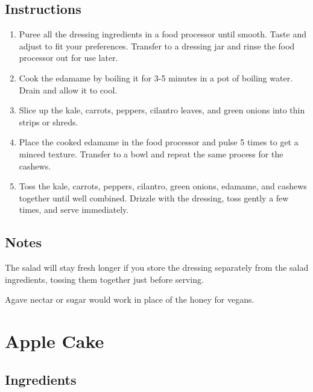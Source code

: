 \documentclass[letterpaper,10pt,english]{sphinxmanual}
\begin{document}
\section{Instructions}
\label{\detokenize{Power_Salad:instructions}}\begin{enumerate}
\item {} 
Puree all the dressing ingredients in a food processor until smooth. Taste and adjust to fit your preferences. Transfer to a dressing jar and rinse the food processor out for use later.

\item {} 
Cook the edamame by boiling it for 3-5 minutes in a pot of boiling water. Drain and allow it to cool.

\item {} 
Slice up the kale, carrots, peppers, cilantro leaves, and green onions into thin strips or shreds.

\item {} 
Place the cooked edamame in the food processor and pulse 5 times to get a minced texture. Transfer to a bowl and repeat the same process for the cashews.

\item {} 
Toss the kale, carrots, peppers, cilantro, green onions, edamame, and cashews together until well combined. Drizzle with the dressing, toss gently a few times, and serve immediately.

\end{enumerate}


\section{Notes}
\label{\detokenize{Power_Salad:notes}}
The salad will stay fresh longer if you store the dressing separately from the salad ingredients, tossing them together just before serving.

Agave nectar or sugar would work in place of the honey for vegans.


\chapter{Apple Cake}
\label{\detokenize{Apple_Cake:apple-cake}}\label{\detokenize{Apple_Cake::doc}}

\section{Ingredients}
\label{\detokenize{Apple_Cake:ingredients}}
%
\begin{sphinxVerbatim}[commandchars=\\\{\}]
   
  
 
     
  
   
  
  
  
\end{sphinxVerbatim}
\end{document}
